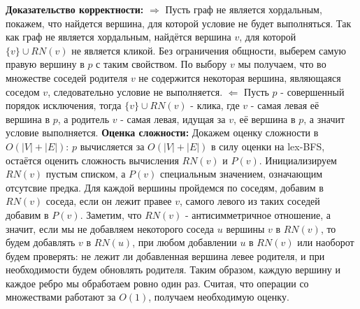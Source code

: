 \documentclass[a4paper,14pt]{article}
\begin{document}
	\newline
	\newline  \textbf{Доказательство корректности:}
	\newline
	\newline  \tab \tab $\Rightarrow$ Пусть граф не является хордальным, покажем, что найдется вершина, для которой условие не будет выполняться. Так как граф не является хордальным, найдётся вершина $v$, для которой $\{v\} \cup RN(v)$ не является кликой. Без ограничения общности, выберем самую правую вершину в $p$ с таким свойством. По выбору $v$ мы получаем, что во множестве соседей родителя $v$ не содержится некоторая вершина, являющаяся соседом $v$, следовательно условие не выполняется.
	\newline  \tab \tab $\Leftarrow$ Пусть $p$ - совершенный порядок исключения, тогда  $\{v\} \cup RN(v)$ - клика, где $v$ - самая левая её вершина в $p$, а родитель $v$ - самая левая, идущая за $v$, её вершина в $p$, а значит условие выполняется.
	\newline 
	\newline  \textbf{Оценка сложности:}
	\newline
	\newline  Докажем оценку сложности в $O(|V| + |E|)$:
	\newline
	\newline $p$ вычисляется за $O(|V| + |E|)$ в силу оценки на lex-BFS, остаётся оценить сложность вычисления $RN(v)$ и $P(v)$. Инициализируем $RN(v)$ пустым списком, а $P(v)$ специальным значением, означающим отсутсвие предка. Для каждой вершины пройдемся по соседям, добавим в $RN(v)$ соседа, если он лежит правее $v$, самого левого из таких соседей добавим в $P(v)$. Заметим, что $RN(v)$ - антисимметричное отношение, а значит, если мы не добавляем некоторого соседа $u$ вершины $v$ в $RN(v)$, то будем добавлять $v$ в $RN(u)$, при любом добавлении $u$ в $RN(v)$ или наоборот будем проверять: не лежит ли добавленная вершина левее родителя, и при необходимости будем обновлять родителя. Таким образом, каждую вершину и каждое ребро мы обработаем ровно один раз. Считая, что операции со множествами работают за $O(1)$, получаем необходимую оценку.   
\end{document}
